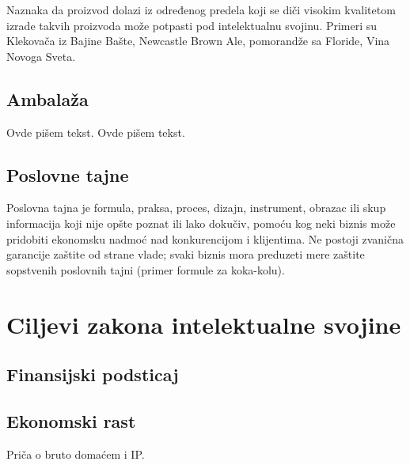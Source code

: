 \documentclass[a4paper]{article}
\begin{document}
Naznaka da proizvod dolazi iz određenog predela koji se diči visokim kvalitetom izrade takvih proizvoda može potpasti pod intelektualnu svojinu. Primeri su Klekovača iz Bajine Bašte, Newcastle Brown Ale, pomorandže sa Floride, Vina Novoga Sveta.

\subsection{Ambalaža}
\label{subsec:ambalaza}

Ovde pišem tekst. 
Ovde pišem tekst. 

\subsection{Poslovne tajne}
\label{subsec:poslovne}

Poslovna tajna je formula, praksa, proces, dizajn, instrument, obrazac ili skup informacija koji nije opšte poznat ili lako dokučiv, pomoću kog neki biznis može pridobiti ekonomsku nadmoć nad konkurencijom i klijentima. Ne postoji zvanična garancije zaštite od strane vlade; svaki biznis mora preduzeti mere zaštite sopstvenih poslovnih tajni (primer formule za koka-kolu).

\section{Ciljevi zakona intelektualne svojine}

\subsection{Finansijski podsticaj}
\label{subsec:fin}



\subsection{Ekonomski rast}
\label{subsec:ekon}

Priča o bruto domaćem i IP.
\end{document}
